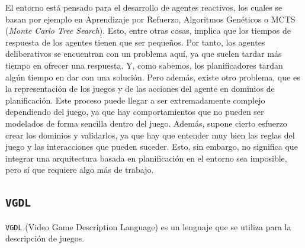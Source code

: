 El entorno está pensado para el desarrollo de agentes reactivos, los cuales se basan por ejemplo en
Aprendizaje por Refuerzo, Algoritmos Genéticos o MCTS (\textit{Monte Carlo Tree Search}). Esto, entre
otras cosas, implica que los tiempos de respuesta de los agentes tienen que ser pequeños. Por tanto,
los agentes deliberativos se encuentran con un problema aquí, ya que suelen tardar más tiempo en ofrecer
una respuesta. Y, como sabemos, los planificadores tardan algún tiempo en dar con una solución. Pero además,
existe otro problema, que es la representación de los juegos y de las acciones del agente en
dominios de planificación. Este proceso puede llegar a ser extremadamente complejo dependiendo
del juego, ya que hay comportamientos que no pueden ser modelados de forma sencilla dentro del juego.
Además, supone cierto esfuerzo crear los dominios y validarlos, ya que hay que entender muy bien las reglas
del juego y las interacciones que pueden suceder. Esto, sin embargo, no significa que integrar una arquitectura
basada en planificación en el entorno sea imposible, pero sí que requiere algo más de trabajo.

\subsection{\texttt{VGDL}}

\texttt{VGDL} (Video Game Description Language) \cite{Schaul2013AVG} es un lenguaje que se
utiliza para la descripción de juegos.